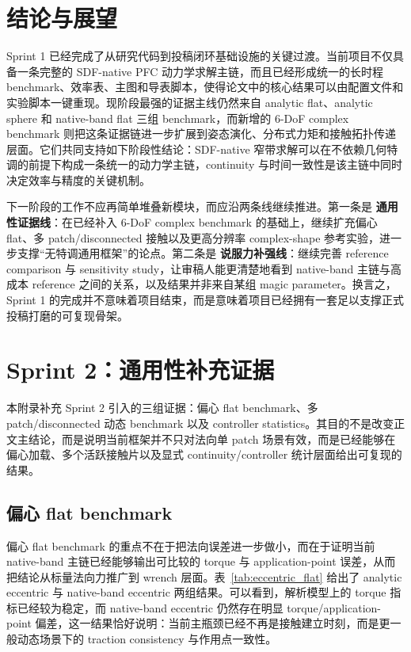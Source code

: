 \documentclass[11pt,a4paper]{ctexart}
\begin{document}
\section{结论与展望}
Sprint 1 已经完成了从研究代码到投稿闭环基础设施的关键过渡。当前项目不仅具备一条完整的 SDF-native PFC 动力学求解主链，而且已经形成统一的长时程 benchmark、效率表、主图和导表脚本，使得论文中的核心结果可以由配置文件和实验脚本一键重现。现阶段最强的证据主线仍然来自 analytic flat、analytic sphere 和 native-band flat 三组 benchmark，而新增的 6-DoF complex benchmark 则把这条证据链进一步扩展到姿态演化、分布式力矩和接触拓扑传递层面。它们共同支持如下阶段性结论：SDF-native 窄带求解可以在不依赖几何特调的前提下构成一条统一的动力学主链，continuity 与时间一致性是该主链中同时决定效率与精度的关键机制。

下一阶段的工作不应再简单堆叠新模块，而应沿两条线继续推进。第一条是 \textbf{通用性证据线}：在已经补入 6-DoF complex benchmark 的基础上，继续扩充偏心 flat、多 patch/disconnected 接触以及更高分辨率 complex-shape 参考实验，进一步支撑“无特调通用框架”的论点。第二条是 \textbf{说服力补强线}：继续完善 reference comparison 与 sensitivity study，让审稿人能更清楚地看到 native-band 主链与高成本 reference 之间的关系，以及结果并非来自某组 magic parameter。换言之，Sprint 1 的完成并不意味着项目结束，而是意味着项目已经拥有一套足以支撑正式投稿打磨的可复现骨架。


\FloatBarrier
\clearpage
\appendix
\section{Sprint 2：通用性补充证据}
本附录补充 Sprint 2 引入的三组证据：偏心 flat benchmark、多 patch/disconnected 动态 benchmark 以及 controller statistics。其目的不是改变正文主结论，而是说明当前框架并不只对法向单 patch 场景有效，而是已经能够在偏心加载、多个活跃接触片以及显式 continuity/controller 统计层面给出可复现的结果。

\subsection{偏心 flat benchmark}
偏心 flat benchmark 的重点不在于把法向误差进一步做小，而在于证明当前 native-band 主链已经能够输出可比较的 torque 与 application-point 误差，从而把结论从标量法向力推广到 wrench 层面。表~\ref{tab:eccentric_flat} 给出了 analytic eccentric 与 native-band eccentric 两组结果。可以看到，解析模型上的 torque 指标已经较为稳定，而 native-band eccentric 仍然存在明显 torque/application-point 偏差，这一结果恰好说明：当前主瓶颈已经不再是接触建立时刻，而是更一般动态场景下的 traction consistency 与作用点一致性。
\end{document}
